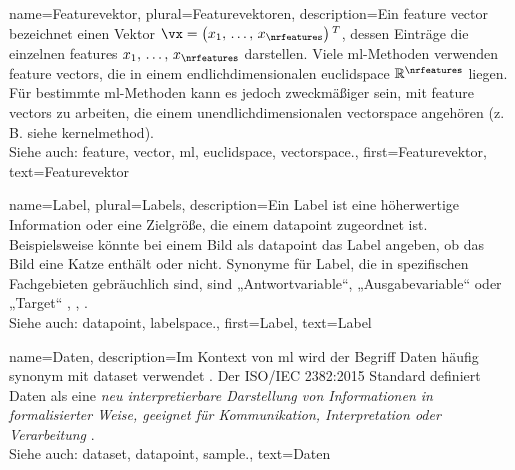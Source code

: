 {{{{
{name={Featurevektor}, plural={Featurevektoren},
description={Ein \Gls{feature} \gls{vector} bezeichnet einen \gls{Vektor} 
    $\vx = \big(x_{1}, \,\ldots, \,x_{\nrfeatures}\big)\,^{T}$, dessen Einträge die einzelnen \glspl{feature} 
    $x_{1}, \,\ldots, \,x_{\nrfeatures}$ darstellen. Viele \gls{ml}-Methoden verwenden \gls{feature} \glspl{vector}, 
    die in einem endlichdimensionalen \gls{euclidspace} $\mathbb{R}^{\nrfeatures}$ liegen. 
    Für bestimmte \gls{ml}-Methoden kann es jedoch zweckmäßiger sein, mit \gls{feature} \glspl{vector} zu arbeiten, 
    die einem unendlichdimensionalen \gls{vectorspace} angehören (z.\,B. siehe \gls{kernelmethod}). 
        \\
    Siehe auch: \gls{feature}, \gls{vector}, \gls{ml}, \gls{euclidspace}, \gls{vectorspace}.}, 
first={Featurevektor},
text={Featurevektor}  
}

{name={Label}, plural={Labels},
description={Ein Label ist eine höherwertige Information oder eine Zielgröße, die einem \gls{datapoint} zugeordnet ist. 
    Beispielsweise könnte bei einem Bild als \gls{datapoint} das Label angeben, ob das Bild eine Katze enthält oder nicht. 
    Synonyme für Label, die in spezifischen Fachgebieten gebräuchlich sind, sind „Antwortvariable“, „Ausgabevariable“ oder „Target“ \cite{Gujarati2021}, \cite{Dodge2003}, \cite{Everitt2010}. 
        \\
    Siehe auch: \gls{datapoint}, \gls{labelspace}.},
first={Label},
text={Label}  
}

{name={Daten},
description={Im Kontext von \gls{ml} wird der Begriff 
Daten häufig synonym mit \gls{dataset} verwendet
\cite{Everitt2010,OxfordStatisticsDictionary}. 
Der ISO/IEC 2382:2015 Standard definiert Daten als eine \emph{neu interpretierbare Darstellung von 
Informationen in formalisierter Weise, geeignet für Kommunikation, Interpretation 
oder Verarbeitung} \cite{ISO2382}. 
  \\
  Siehe auch: \gls{dataset}, \gls{datapoint}, \gls{sample}.}, 
text={Daten}
}



}}}}
